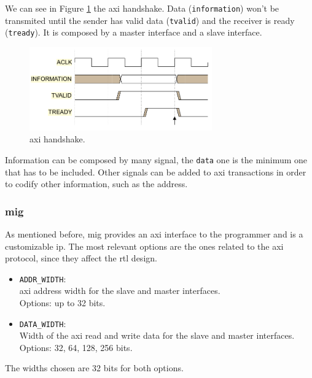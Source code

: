 We can see in Figure \ref{fig:axi} the \gls{axi} handshake. %
Data (\texttt{information}) won't be transmited until the sender has valid data (\texttt{tvalid}) and the receiver is ready (\texttt{tready}).
It is composed by a master interface and a slave interface.

\begin{figure}
    \centering
    \includegraphics[width=0.7\textwidth]{images/axi.png}
    \caption{\gls{axi} handshake.}
    \label{fig:axi}
\end{figure}

Information can be composed by many signal, the \texttt{data} one is the minimum one that has to be included.
Other signals can be added to \gls{axi} transactions in order to codify other information, such as the address.

\subsubsection{\acrshort{mig}}
As mentioned before, \gls{mig} provides an \gls{axi} interface to the programmer and is a customizable \gls{ip}. 
The most relevant options are the ones related to the \gls{axi} protocol, since they affect the \gls{rtl} design.
\begin{itemize}
    \item \texttt{ADDR\_WIDTH}: \\
        \gls{axi} address width for the slave and master interfaces. \\
        Options: up to 32 bits.
        
    \item \texttt{DATA\_WIDTH}: \\
        Width of the \gls{axi} read and write data for the slave and master interfaces. \\
        Options: 32, 64, 128, 256 bits.
\end{itemize}

The widths chosen are 32 bits for both options.

